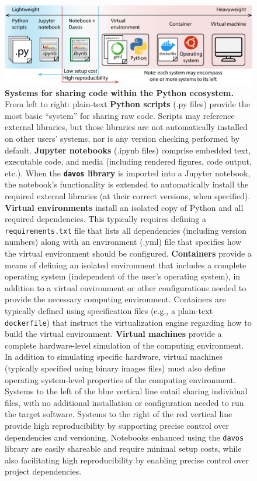 \documentclass[preprint,12pt, a4paper]{elsarticle}
\begin{document}
\begin{figure}[tp]
\centering
\includegraphics[width=\textwidth]{figs/shareable_code}
\caption{\small \textbf{Systems for sharing code within the Python
    ecosystem.}  From left to right: plain-text \textbf{Python
    scripts} (.py files) provide the
  most basic ``system'' for sharing raw code.  Scripts may reference
  external libraries, but those libraries are not automatically
  installed on other users' systems, nor is any version checking
  performed by default.  \textbf{Jupyter notebooks} (.ipynb files) comprise embedded text,
  executable code, and media (including rendered figures, code output,
  etc.).  When the \textbf{\texttt{davos} library} is imported into a Jupyter
  notebook, the notebook's functionality is extended to automatically
  install the required external libraries (at their correct versions,
  when specified).  \textbf{Virtual environments} install an isolated copy of
  Python and all required dependencies.  This typically requires
  defining a \texttt{requirements.txt} file that lists all
  dependencies (including version numbers) along with an environment
  (.yml) file that specifies how the virtual environment should be
  configured.  \textbf{Containers} provide a means of defining an isolated
  environment that includes a complete operating system (independent
  of the user's operating system), in addition to a virtual
  environment or other configurations needed to provide the necessary
  computing environment.  Containers are typically defined using
  specification files (e.g., a plain-text \texttt{dockerfile}) that
  instruct the virtualization engine regarding how to build the
  virtual environment.  \textbf{Virtual machines} provide a complete
  hardware-level simulation of the computing environment.  In addition
  to simulating specific hardware, virtual machines (typically
  specified using binary images files) must also define operating
  system-level properties of the computing environment.  Systems to
  the left of the blue vertical line entail sharing individual
  files, with no additional installation or configuration needed to
  run the target software.  Systems to the right of the red vertical
  line provide high reproducibility by supporting precise control over
  dependencies and versioning.  Notebooks enhanced using the
  \texttt{davos} library are easily shareable and require minimal
  setup costs, while also facilitating high reproducibility by
  enabling precise control over project dependencies.}
\label{fig:code-sharing}
\end{figure}
\end{document}

